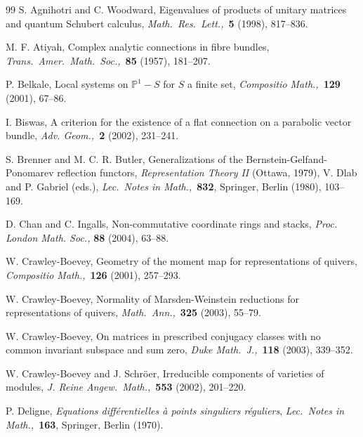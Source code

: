 \documentclass{amsart}
\theoremstyle{plain}
\theoremstyle{definition}
\theoremstyle{remark}
\newcommand{\PP}{\mathbb{P}}
\newcommand{\smalltextsc}[1]{#1}
\begin{document}
\begin{thebibliography}{99}
S. \smalltextsc{Agnihotri} and C. \smalltextsc{Woodward},
Eigenvalues of products of unitary matrices and quantum Schubert calculus,
\textit{Math.\ Res.\ Lett.,}\ \textbf{5} (1998), 817--836.

M. F. \smalltextsc{Atiyah},
Complex analytic connections in fibre bundles,
\textit{Trans.\ Amer.\ Math.\ Soc.,}\ \textbf{85} (1957), 181--207.

P. \smalltextsc{Belkale},
Local systems on $\PP^1-S$ for $S$ a finite set,
\textit{Compositio Math.,}\ \textbf{129} (2001), 67--86.

I. \smalltextsc{Biswas},
A criterion for the existence of a flat connection on a parabolic vector bundle,
\textit{Adv. Geom.,}\ \textbf{2} (2002), 231--241.

S. \smalltextsc{Brenner} and M. C. R. \smalltextsc{Butler},
Generalizations of the Bernstein-Gelfand-Ponomarev reflection functors,
\textit{Representation Theory II} (Ottawa, 1979),
V. \smalltextsc{Dlab} and P. \smalltextsc{Gabriel} (eds.),
\textit{Lec.\ Notes in Math.,}\ \textbf{832}, Springer, Berlin (1980), 103--169.

D. \smalltextsc{Chan} and C. \smalltextsc{Ingalls},
Non-commutative coordinate rings and stacks,
\textit{Proc. London Math. Soc.,} \textbf{88} (2004), 63--88.

W. \smalltextsc{Crawley-Boevey},
Geometry of the moment map for representations of quivers,
\textit{Compositio Math.,}\ \textbf{126} (2001), 257--293.

W. \smalltextsc{Crawley-Boevey},
Normality of Marsden-Weinstein reductions for representations of quivers,
\textit{Math.\ Ann.,}\ \textbf{325} (2003), 55--79.

W. \smalltextsc{Crawley-Boevey},
On matrices in prescribed conjugacy classes with no common invariant subspace and sum zero,
\textit{Duke Math.\ J.,}\ \textbf{118} (2003), 339--352.

W. \smalltextsc{Crawley-Boevey} and J. \smalltextsc{Schr\"oer},
Irreducible components of varieties of modules,
\textit{J. Reine Angew.\ Math.,}\ \textbf{553} (2002), 201--220.

P. \smalltextsc{Deligne},
\textit{Equations diff\'erentielles \`a points singuliers r\'eguliers},
\textit{Lec.\ Notes in Math.,}\ \textbf{163}, Springer, Berlin (1970).


\end{thebibliography}
\end{document}
